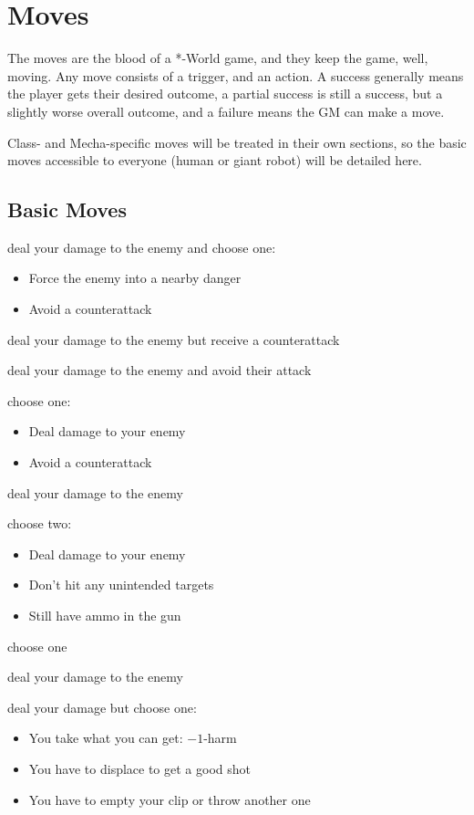 \section{Moves}
The moves are the blood of a *-World game, and they keep the game,
well, moving. Any move consists of a trigger, and an action. A success
generally means the player gets their desired outcome, a partial
success is still a success, but a slightly worse overall outcome, and
a failure means the GM can make a move.

Class- and Mecha-specific moves will be treated in their own sections,
so the basic moves accessible to everyone (human or giant robot) will
be detailed here.

\subsection{Basic Moves}

{deal your damage to the enemy and choose one:
\begin{itemize}
\item Force the enemy into a nearby danger
\item Avoid a counterattack
\end{itemize}}
{deal your damage to the enemy but receive a counterattack}

{deal your damage to the enemy and avoid their attack}
{choose one:
\begin{itemize}
\item Deal damage to your enemy
\item Avoid a counterattack
\end{itemize}}

{deal your damage to the enemy}
{choose two:
\begin{itemize}
\item Deal damage to your enemy
\item Don't hit any unintended targets
\item Still have ammo in the gun
\end{itemize}}
{choose one}

{deal your damage to the enemy}
{deal your damage but choose one:
\begin{itemize}
\item You take what you can get: $-1$-harm
\item You have to displace to get a good shot
\item You have to empty your clip or throw another one
\end{itemize}}

